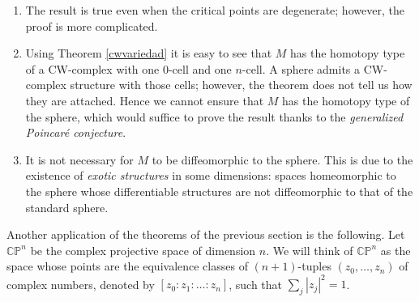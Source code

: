 \begin{remark}
    \hfil
    \begin{enumerate}[label=(\roman*)]
        \item The result is true even when the critical points are degenerate; however, the proof is more complicated.
        \item Using Theorem \ref{cwvariedad} it is easy to see that $M$ has the homotopy type of a CW-complex with one $0$-cell and one $n$-cell. A sphere admits a CW-complex structure with those cells; however, the theorem does not tell us how they are attached. Hence we cannot ensure that $M$ has the homotopy type of the sphere, which would suffice to prove the result thanks to the \textit{generalized Poincaré conjecture}.
        \item It is not necessary for $M$ to be diffeomorphic to the sphere. This is due to the existence of \textit{exotic structures} in some dimensions: spaces homeomorphic to the sphere whose differentiable structures are not diffeomorphic to that of the standard sphere.
    \end{enumerate}
\end{remark}

\newpage

Another application of the theorems of the previous section is the following. Let $\mathbb{CP}^n$ be the complex projective space of dimension $n$. We will think of $\mathbb{CP}^n$ as the space whose points are the equivalence classes of $(n+1)$-tuples $(z_0,\dots,z_n)$ of complex numbers, denoted by $[z_0:z_1:\dots:z_n]$, such that $\sum_j |z_j|^2=1$.

